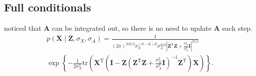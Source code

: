 \documentclass{article}
\begin{document}
\subsection{Full conditionals}
  \citet{griffiths2005infinite} noticed that $\mathbf{A}$ can be integrated out, so there is no need to update $\mathbf{A}$ each step.
  \begin{multline}
    p(\mathbf{X}\mid \mathbf{Z}, \sigma_X, \sigma_A) = \frac{1}{(2\pi)^{ND/2}\sigma_X^{(N-K)D}\sigma_A^{KD}|{\mathbf{Z}}^{\mathrm{T}}\mathbf{Z}+\frac{\sigma_X^2}{\sigma_A^2}\mathbf{I}|^{D/2}} \\
    \exp\left\{-\frac{1}{2\sigma_X^2}\mathrm{tr}({\mathbf{X}}^{\mathrm{T}}(\mathbf{I}-\mathbf{Z}({\mathbf{Z}}^{\mathrm{T}}\mathbf{Z}+\frac{\sigma_X^2}{\sigma_A^2}\mathbf{I})^{-1}{\mathbf{Z}}^{\mathrm{T}})\mathbf{X})\right\}.
  \end{multline}
\end{document}
